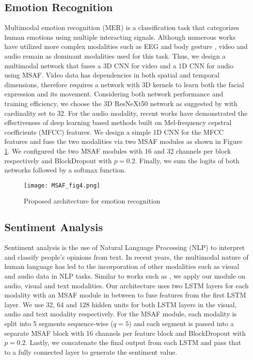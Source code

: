 \documentclass[10pt,twocolumn,letterpaper]{article}
\begin{document}
\subsection{Emotion Recognition}
Multimodal emotion recognition (MER) is a classification task that categorizes human emotions using multiple interacting signals. Although numerous works have utilized more complex modalities such as EEG \cite{zheng2014multimodal} and body gesture \cite{de2006towards}, video and audio remain as dominant modalities used for this task. Thus, we design a multimodal network that fuses a 3D CNN for video and a 1D CNN for audio using MSAF. Video data has dependencies in both spatial and temporal dimensions, therefore requires a network with 3D kernels to learn both the facial expression and its movement. Considering both network performance and training efficiency, we choose the 3D ResNeXt50 network \cite{xie2016aggregated} as suggested by \cite{hara2017can} with cardinality set to 32. For the audio modality, recent works \cite{neverova2015moddrop, wang2020speech} have demonstrated the effectiveness of deep learning based methods built on Mel-frequency cepstral coefficients (MFCC) features. We design a simple 1D CNN for the MFCC features and fuse the two modalities via two MSAF modules as shown in Figure \ref{fig4}. We configured the two MSAF modules with 16 and 32 channels per block respectively and BlockDropout with $p=0.2$. Finally, we sum the logits of both networks followed by a softmax function.

\begin{figure}[ht]
\centering
\texttt{[image: MSAF\_fig4.png]} \caption{Proposed architecture for emotion recognition}
\label{fig4}
\end{figure}

\subsection{Sentiment Analysis}
Sentiment analysis is the use of Natural Language Processing (NLP) to interpret and classify people’s opinions from text. In recent years, the multimodal nature of human language has led to the incorporation of other modalities such as visual and audio data in NLP tasks. Similar to works such as \cite{sun2019learning,hazarika2020misa}, we apply our module on audio, visual and text modalities. Our architecture uses two LSTM layers for each modality with an MSAF module in between to fuse features from the first LSTM layer. We use 32, 64 and 128 hidden units for both LSTM layers in the visual, audio and text modality respectively. For the MSAF module, each modality is split into 5 segments sequence-wise ($q=5$) and each segment is passed into a separate MSAF block with 16 channels per feature block and BlockDropout with $p=0.2$. Lastly, we concatenate the final output from each LSTM and pass that to a fully connected layer to generate the sentiment value.
\end{document}

